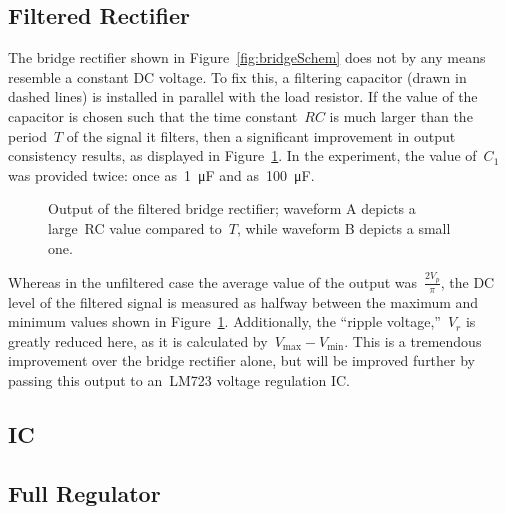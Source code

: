 \subsection{Filtered Rectifier}
The bridge rectifier shown in Figure~\ref{fig:bridgeSchem} does not by any
means resemble a constant DC voltage.  To fix this, a filtering capacitor
(drawn in dashed lines) is installed in parallel with the load resistor.  If
the value of the capacitor is chosen such that the time constant~$RC$ is much
larger than the period~$T$ of the signal it filters, then a significant
improvement in output consistency results, as displayed in
Figure~\ref{fig:bridgeRectOutFilt}.  In the experiment, the value of~$C_1$ was
provided twice: once as~\SI{1}{\micro\farad} and as~\SI{100}{\micro\farad}.
%
\begin{figure}[H]
	\centering
	
	\parbox{.6\textwidth}{
	\caption{Output of the filtered bridge rectifier; waveform A depicts a
	large~RC value compared to~$T$, while waveform B depicts a small one.}
	\label{fig:bridgeRectOutFilt}
	}
\end{figure}
%
Whereas in the unfiltered case the average value of the output was~$\frac{2
V_p}{\pi}$, the DC level of the filtered signal is measured as halfway between
the maximum and minimum values shown in Figure~\ref{fig:bridgeRectOutFilt}.
Additionally, the ``ripple voltage,''~$V_r$ is greatly reduced here, as it is
calculated by~$V_\text{max} - V_\text{min}$.  This is a tremendous improvement
over the bridge rectifier alone, but will be improved further by passing this
output to an~LM723 voltage regulation IC.



\subsection{IC}

\begin{figure}[H]
	\centering
	
\end{figure}

\subsection{Full Regulator}
\begin{figure}[H]
	\centering
	
\end{figure}
